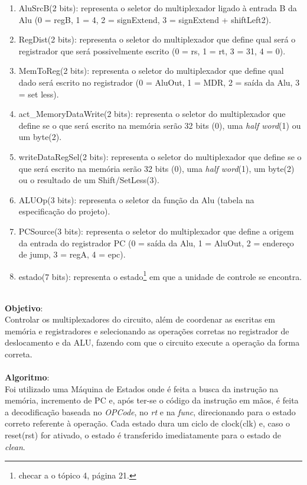 \documentclass{article}
\begin{document}
\begin{enumerate}
        \item AluSrcB(2 bits): representa o seletor do multiplexador ligado à entrada B da Alu (0 = regB, 1 = 4, 2 = signExtend, 3 = signExtend + shiftLeft2).
        \item RegDist(2 bits): representa o seletor do multiplexador que define qual será o registrador que será possivelmente escrito (0 = rs, 1 = rt, 3 = 31, 4 = 0).
        \item MemToReg(2 bits): representa o seletor do multiplexador que define qual dado será escrito no registrador (0 = AluOut, 1 = MDR, 2 = saída da Alu, 3 = set less).
        \item act\_MemoryDataWrite(2 bits): representa o seletor do multiplexador que define se o que será escrito na memória serão 32 bits (0), uma {\it half word}(1) ou um byte(2).
        \item writeDataRegSel(2 bits): representa o seletor do multiplexador que define se o que será escrito na memória serão 32 bits (0), uma {\it half word}(1), um byte(2) ou o resultado de um Shift/SetLess(3).
        \item ALUOp(3 bits): representa o seletor da função da Alu (tabela na especificação do projeto).
        \item PCSource(3 bits): representa o seletor do multiplexador que define a origem da entrada do registrador PC (0 = saída da Alu, 1 = AluOut, 2 = endereço de jump, 3 = regA, 4 = epc).
        \item estado(7 bits): representa o estado\footnote{checar a o tópico 4, página 21.} em que a unidade de controle se encontra.\\
    \end{enumerate}
\\
    \textbf{Objetivo}:\\
    Controlar os multiplexadores do circuito, além de coordenar as escritas em memória e registradores e selecionando as operações corretas no registrador de deslocamento e da ALU, fazendo com que o circuito execute a operação da forma correta.
    \\
    \\
    \textbf{Algoritmo}:\\
    Foi utilizado uma Máquina de Estados onde é feita a busca da instrução na memória, incremento de PC e, após ter-se o código da instrução em mãos, é feita a decodificação baseada no {\it OPCode}, no {\it rt} e na {\it func}, direcionando para o estado correto referente à operação. Cada estado dura um ciclo de clock(clk) e, caso o reset(rst) for ativado, o estado é transferido imediatamente para o estado de {\it clean}.
    
\end{document}
